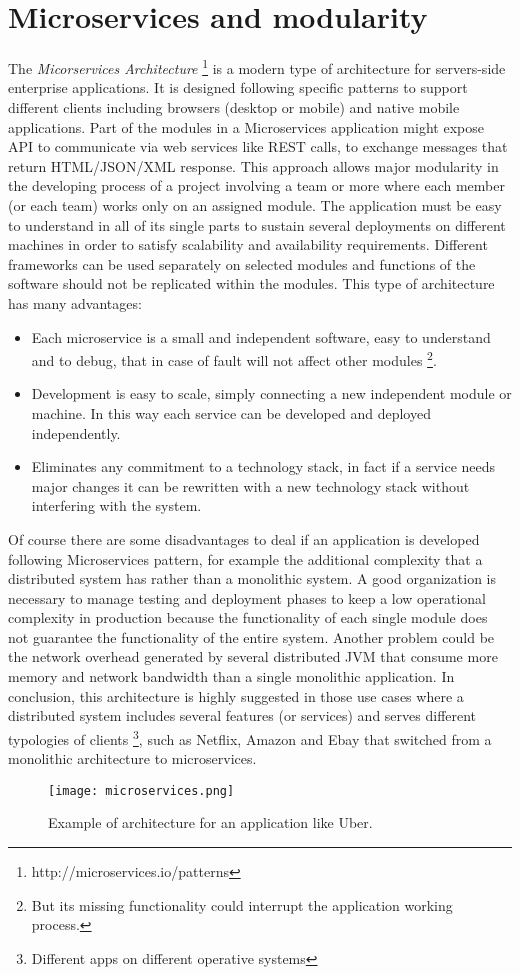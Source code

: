 \section{Microservices and modularity}
\label{sec:4}
The \textit{Micorservices Architecture} \footnote{http://microservices.io/patterns} is a modern type of architecture for servers-side enterprise applications. It is designed following specific patterns to support different clients including browsers (desktop or mobile) and native mobile applications. Part of the modules in a Microservices application might expose API to communicate via web services like REST calls, to exchange messages that return HTML/JSON/XML response.
This approach allows major modularity in the developing process of a project involving a team or more where each member (or each team) works only on an assigned module.
The application must be easy to understand in all of its single parts to sustain several deployments on different machines in order to satisfy scalability and availability requirements.
Different frameworks can be used separately on selected modules and functions of the software should not be replicated within the modules.
This type of architecture has many advantages:
\begin{itemize}
	\item Each microservice is a small and independent software, easy to understand and to debug, that in case of fault will not affect other modules \footnote{But its missing functionality could interrupt the application working process.}.
	\item Development is easy to scale, simply connecting a new independent module or machine. In this way each service can be developed and deployed independently.
	\item Eliminates any commitment to a technology stack, in fact if a service needs major changes  it can be rewritten with a new technology stack without interfering with the system.
\end{itemize}
Of course there are some disadvantages to deal if an application is developed following Microservices pattern, for example the additional complexity that a distributed system has rather than a monolithic system.
A good organization is necessary to manage testing and deployment phases  to keep a low operational complexity in production because the functionality of each single module does not guarantee the functionality of the entire system.
Another problem could be the network overhead generated by several distributed JVM that consume more memory and  network bandwidth than a single monolithic application.
In conclusion, this architecture is highly suggested in those use cases where a distributed system  includes several features (or services) and serves different typologies of clients \footnote{Different apps on different operative systems}, such as Netflix, Amazon and Ebay that switched from a monolithic architecture to microservices.
\begin{figure}[H]
\texttt{[image: microservices.png]}
\centering
\caption{Example of architecture for an application like Uber.} 
\end{figure}

